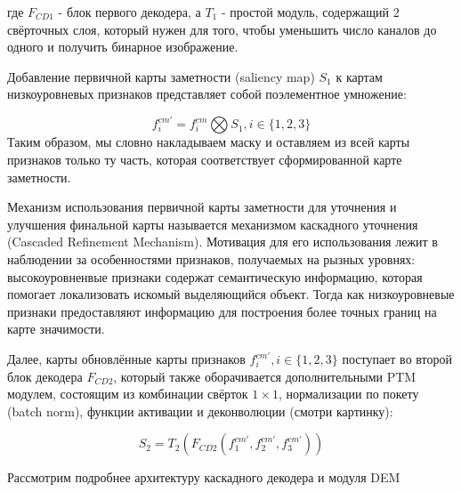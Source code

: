 где $F_{CD1}$ - блок первого декодера, а $T_1$ - простой модуль, содержащий 2 свёрточных слоя, который
нужен для того, чтобы уменьшить число каналов до одного и получить бинарное изображение.

Добавление первичной карты заметности (saliency map) $S_1$ к картам низкоуровневых признаков представляет собой
 поэлементное умножение:

\begin{equation}
    f_i^{cm'} = f_i^{cm} \bigotimes S_1, i \in \{1,2,3\}
\end{equation}
Таким образом, мы словно накладываем маску и оставляем из всей карты признаков только ту часть, которая соответствует 
сформированной карте заметности.

Механизм использования первичной карты заметности для уточнения и улучшения финальной карты называется механизмом каскадного уточнения (Cascaded Refinement Mechanism).
Мотивация для его использования лежит в наблюдении за особенностями признаков, получаемых на рызных уровнях: высокоуровненвые признаки содержат семантическую информацию,
которая помогает локализовать искомый выделяющийся объект. Тогда как низкоуровневые признаки предоставляют информацию для построения более точных границ на карте значимости.

Далее, карты обновлённые карты признаков $f_i^{cm'}, i \in \{1,2,3\} $ поступает во второй блок декодера $F_{CD2}$, который также оборачивается дополнительными PTM модулем,
состоящим из комбинации свёрток $1 \times 1$, нормализации по покету (batch norm), функции активации и деконволюции (смотри картинку):

\begin{equation}
    S_2 = T_2(F_{CD2}(f_1^{cm'},f_2^{cm'},f_3^{cm'}))
\end{equation}


Рассмотрим подробнее архитектуру каскадного декодера и модуля DEM